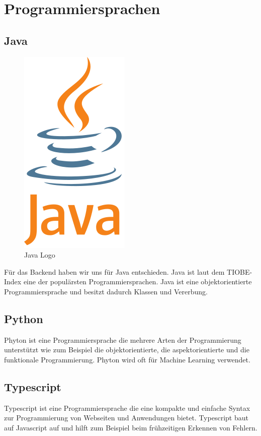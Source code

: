 \section{Programmiersprachen}

\subsection{Java}

\begin{figure}[hbt!]
    \centering
    \includegraphics[scale=0.5]{pics/java}
    \caption{Java Logo\cite{java}}
    \label{fig:impl:java}
\end{figure}

Für das Backend haben wir uns für Java entschieden. Java ist laut dem TIOBE-Index\cite{tiobe} eine der populärsten Programmiersprachen.
Java ist eine objektorientierte Programmiersprache und besitzt dadurch Klassen und Vererbung\cite{java}.

\subsection{Python}
Phyton ist eine Programmiersprache die mehrere Arten der Programmierung unterstützt wie zum Beispiel die objektorientierte, die aspektorientierte und die funktionale Programmierung.
Phyton wird oft für Machine Learning verwendet.

\subsection{Typescript}
Typescript ist eine Programmiersprache die eine kompakte und einfache Syntax zur Programmierung von Webseiten und Anwendungen bietet.
Typescript baut auf Javascript auf und hilft zum Beispiel beim frühzeitigen Erkennen von Fehlern.

